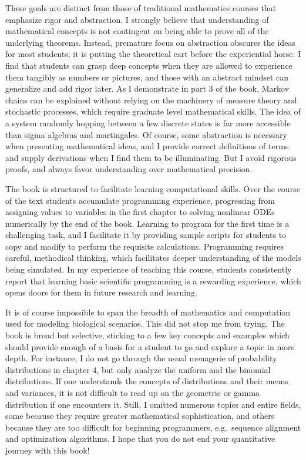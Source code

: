 \documentclass[
]{book}
\theoremstyle{definition}
\theoremstyle{definition}
\theoremstyle{definition}
\theoremstyle{remark}
\begin{document}
These goals are distinct from those of traditional mathematics courses that emphasize rigor and abstraction. I strongly believe that understanding of mathematical concepts is not contingent on being able to prove all of the underlying theorems. Instead, premature focus on abstraction obscures the ideas for most students; it is putting the theoretical cart before the experiential horse. I find that students can grasp deep concepts when they are allowed to experience them tangibly as numbers or pictures, and those with an abstract mindset can generalize and add rigor later. As I demonstrate in part 3 of the book, Markov chains can be explained without relying on the machinery of measure theory and stochastic processes, which require graduate level mathematical skills. The idea of a system randomly hopping between a few discrete states is far more accessible than sigma algebras and martingales. Of course, some abstraction is necessary when presenting mathematical ideas, and I provide correct definitions of terms and supply derivations when I find them to be illuminating. But I avoid rigorous proofs, and always favor understanding over mathematical precision.

The book is structured to facilitate learning computational skills. Over the course of the text students accumulate programming experience, progressing from assigning values to variables in the first chapter to solving nonlinear ODEs numerically by the end of the book. Learning to program for the first time is a challenging task, and I facilitate it by providing sample scripts for students to copy and modify to perform the requisite calculations. Programming requires careful, methodical thinking, which facilitates deeper understanding of the models being simulated. In my experience of teaching this course, students consistently report that learning basic scientific programming is a rewarding experience, which opens doors for them in future research and learning.

It is of course impossible to span the breadth of mathematics and computation used for modeling biological scenarios. This did not stop me from trying. The book is broad but selective, sticking to a few key concepts and examples which should provide enough of a basis for a student to go and explore a topic in more depth. For instance, I do not go through the usual menagerie of probability distributions in chapter 4, but only analyze the uniform and the binomial distributions. If one understands the concepts of distributions and their means and variances, it is not difficult to read up on the geometric or gamma distribution if one encounters it. Still, I omitted numerous topics and entire fields, some because they require greater mathematical sophistication, and others because they are too difficult for beginning programmers, e.g.~sequence alignment and optimization algorithms. I hope that you do not end your quantitative journey with this book!
\end{document}

